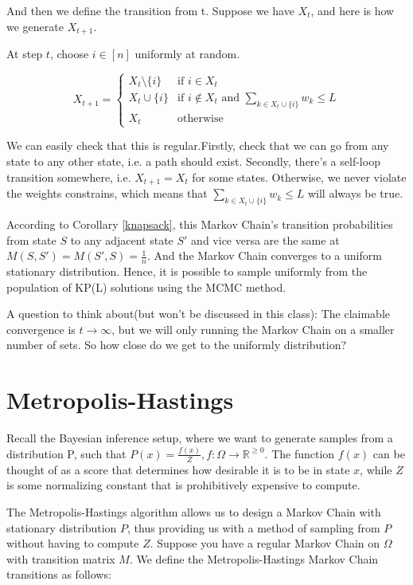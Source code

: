 \documentclass[twoside]{article}
\begin{document}
And then we define the transition from t. Suppose we have $X_t$, and here is how we generate $X_{t+1}$.  

At step $t$, choose $i \in [n]$ uniformly at random.

$$
X_{t+1} = \begin{cases}
   X_t \setminus \{i\} & \text{if } i \in X_t \\
   X_t \cup \{i\} & \text{if } i \notin X_t \text{ and } \sum_{k \in X_t \cup \{i\}} w_k \leq L\\
   X_t & \text{otherwise}
\end{cases}
$$

We can easily check that this is regular.Firstly, check that we can go from any state to any other state, i.e. a path should exist. Secondly, there's a self-loop transition somewhere, i.e. $X_{t+1}=X_t$ for some states. Otherwise, we never violate the weights constrains, which means that $\sum_{k \in X_t \cup \{i\}} w_k \leq L $ will always be true.

According to Corollary \ref{knapsack}, this Markov Chain's transition probabilities from state $S$ to any adjacent state $S'$ and vice versa are the same at $M(S, S') = M(S', S) = \frac{1}{n}$. And the Markov Chain converges to a uniform stationary distribution. Hence, it is possible to sample uniformly from the population of KP(L) solutions using the MCMC method.

A question to think about(but won't be discussed in this class): The claimable convergence is $t \rightarrow \infty$, but we will only running the Markov Chain on a smaller number of sets. So how close do we get to the uniformly distribution?

\section{Metropolis-Hastings}

Recall the Bayesian inference setup, where we want to generate samples from a distribution P, such that $P(x) = \frac{f(x)}{Z}, f: \Omega \rightarrow \mathbb{R}^{\geq 0}$. The function $f(x)$ can be thought of as a score that determines how desirable it is to be in state $x$, while $Z$ is some normalizing constant that is prohibitively expensive to compute. 

The Metropolis-Hastings algorithm allows us to design a Markov Chain with stationary distribution $P$, thus providing us with a method of sampling from $P$ without having to compute $Z$. Suppose you have a regular Markov Chain on $\Omega$ with transition matrix $M$. We define the Metropolis-Hastings Markov Chain transitions as follows:
\end{document}
